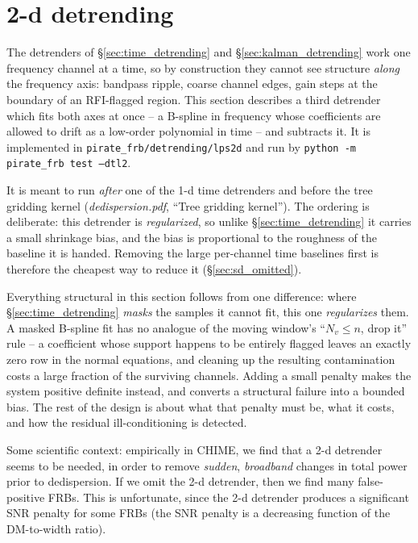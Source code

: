 \documentclass{article}
\numberwithin{equation}{section}   %
\newcommand{\ddnotes}[1]{{\em dedispersion.pdf}, ``#1''}
\begin{document}
\clearpage

\section{2-d detrending}
\label{sec:detrending_2d}

The detrenders of \S\ref{sec:time_detrending} and \S\ref{sec:kalman_detrending} work one frequency channel at
a time, so by construction they cannot see structure {\em along} the frequency axis: bandpass ripple, coarse
channel edges, gain steps at the boundary of an RFI-flagged region.  This section describes a third detrender
which fits both axes at once -- a B-spline in frequency whose coefficients are allowed to drift as a low-order
polynomial in time -- and subtracts it.  It is implemented in {\tt pirate\_frb/detrending/lps2d} and run by
{\tt python -m pirate\_frb test --dtl2}.

It is meant to run {\em after} one of the 1-d time detrenders and before the tree gridding kernel
(\ddnotes{Tree gridding kernel}).  The ordering is deliberate: this detrender is {\em regularized}, so unlike
\S\ref{sec:time_detrending} it carries a small shrinkage bias, and the bias is proportional to the roughness of
the baseline it is handed.  Removing the large per-channel time baselines first is therefore the cheapest way
to reduce it (\S\ref{sec:sd_omitted}).

Everything structural in this section follows from one difference: where \S\ref{sec:time_detrending}
{\em masks} the samples it cannot fit, this one {\em regularizes} them.  A masked B-spline fit has no analogue
of the moving window's ``$N_v \le n$, drop it'' rule -- a coefficient whose support happens to be entirely
flagged leaves an exactly zero row in the normal equations, and cleaning up the resulting contamination costs a
large fraction of the surviving channels.  Adding a small penalty makes the system positive definite instead,
and converts a structural failure into a bounded bias.  The rest of the design is about what that penalty must
be, what it costs, and how the residual ill-conditioning is detected.

Some scientific context: empirically in CHIME, we find that a 2-d detrender seems to be needed,
in order to remove {\em sudden}, {\em broadband} changes in total power prior to dedispersion.
If we omit the 2-d detrender, then we find many false-positive FRBs.
This is unfortunate, since the 2-d detrender produces a significant SNR penalty for some FRBs
(the SNR penalty is a decreasing function of the DM-to-width ratio).
\end{document}
